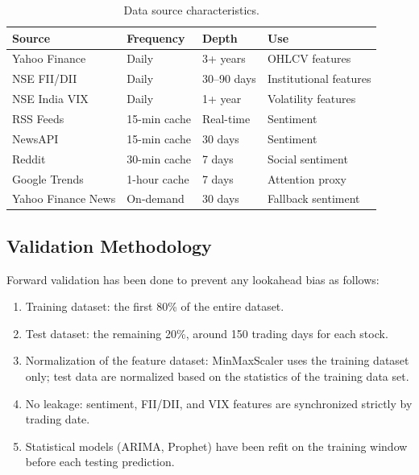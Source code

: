 \documentclass[10pt,a4paper,twoside]{article}
\begin{document}
\begin{table}[htb]
  \begin{center}
    {\caption{Data source characteristics.}\label{tab:datasources}}
    \begin{tabular}{|l|l|l|l|}
    \hline
    \textbf{Source} & \textbf{Frequency} & \textbf{Depth} & \textbf{Use} \\
    \hline
    Yahoo Finance & Daily & 3+ years & OHLCV features \\
    NSE FII/DII & Daily & 30--90 days & Institutional features \\
    NSE India VIX & Daily & 1+ year & Volatility features \\
    RSS Feeds & 15-min cache & Real-time & Sentiment \\
    NewsAPI & 15-min cache & 30 days & Sentiment \\
    Reddit & 30-min cache & 7 days & Social sentiment \\
    Google Trends & 1-hour cache & 7 days & Attention proxy \\
    Yahoo Finance News & On-demand & 30 days & Fallback sentiment \\
    \hline
    \end{tabular}
  \end{center}
\end{table}

\subsection{Validation Methodology}

Forward validation has been done to prevent any lookahead bias as follows:
\begin{enumerate}
\item Training dataset: the first 80\% of the entire dataset.
\item Test dataset: the remaining 20\%, around 150 trading days for each stock.
\item Normalization of the feature dataset: MinMaxScaler uses the training dataset only; test data are normalized based on the statistics of the training data set.
\item No leakage: sentiment, FII/DII, and VIX features are synchronized strictly by trading date.
\item Statistical models (ARIMA, Prophet) have been refit on the training window before each testing prediction.
\end{enumerate}

\end{document}
